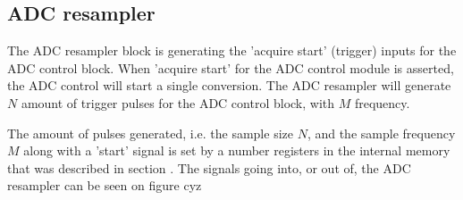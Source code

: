 \subsection{ADC resampler} \label{subsec:ADCResampler}
The ADC resampler block is generating the 'acquire start' (trigger) inputs for the ADC control block. When 'acquire start' for the ADC control module is asserted, the ADC control will start a single conversion. The ADC resampler will generate $N$ amount of trigger pulses for the ADC control block, with $M$ frequency.

The amount of pulses generated, i.e. the sample size $N$, and the sample frequency $M$ along with a 'start' signal is set by a number registers in the internal memory that was described in section . The signals going into, or out of, the ADC resampler can be seen on figure cyz

